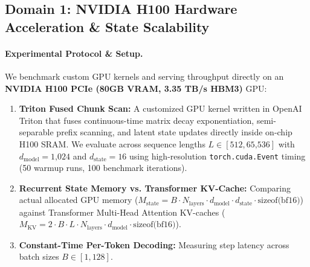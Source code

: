 \subsection{Domain 1: NVIDIA H100 Hardware Acceleration \& State Scalability}
\label{sec:exp_h100}

\paragraph{Experimental Protocol \& Setup.}
We benchmark custom GPU kernels and serving throughput directly on an \textbf{NVIDIA H100 PCIe (80GB VRAM, 3.35 TB/s HBM3)} GPU:
\begin{enumerate}[leftmargin=*]
    \item \textbf{Triton Fused Chunk Scan:} A customized GPU kernel written in OpenAI Triton that fuses continuous-time matrix decay exponentiation, semi-separable prefix scanning, and latent state updates directly inside on-chip H100 SRAM. We evaluate across sequence lengths $L \in [512, 65\text{,}536]$ with $d_{\text{model}}=1\text{,}024$ and $d_{\text{state}}=16$ using high-resolution \texttt{torch.cuda.Event} timing (50 warmup runs, 100 benchmark iterations).
    \item \textbf{Recurrent State Memory vs. Transformer KV-Cache:} Comparing actual allocated GPU memory ($M_{\text{state}} = B \cdot N_{\text{layers}} \cdot d_{\text{model}} \cdot d_{\text{state}} \cdot \text{sizeof(bf16)}$) against Transformer Multi-Head Attention KV-caches ($M_{\text{KV}} = 2 \cdot B \cdot L \cdot N_{\text{layers}} \cdot d_{\text{model}} \cdot \text{sizeof(bf16)}$).
    \item \textbf{Constant-Time Per-Token Decoding:} Measuring step latency across batch sizes $B \in [1, 128]$.
\end{enumerate}

